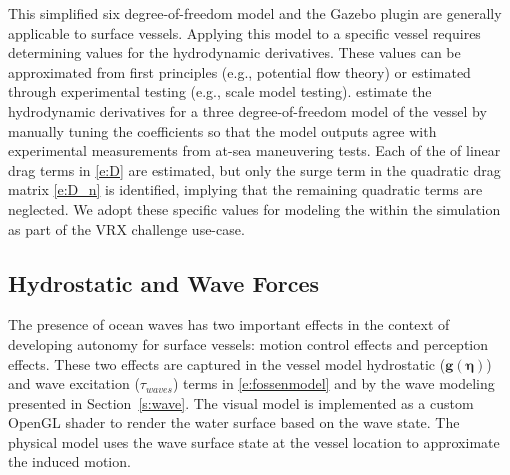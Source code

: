 \documentclass[utf8]{frontiersSCNS} %
\begin{document}
This simplified six degree-of-freedom model and the Gazebo plugin are generally applicable to surface vessels.  Applying this model to a specific vessel requires determining values for the hydrodynamic derivatives.  These values can be approximated from first principles (e.g., potential flow theory) or estimated through experimental testing (e.g., scale model testing).  \citet{sarda16station} estimate the hydrodynamic derivatives for a three degree-of-freedom model of the \wamv{} vessel by manually tuning the coefficients so that the model outputs agree with experimental measurements from at-sea maneuvering tests.  Each of the of linear drag terms in  \eqref{e:D} are estimated, but only the surge term in the quadratic drag matrix \eqref{e:D_n} is identified, implying that the remaining quadratic terms are neglected. We adopt these specific values for modeling the \wamv{} within the simulation as part of the VRX challenge use-case.

\subsection{Hydrostatic and Wave Forces}
The presence of ocean waves has two important effects in the context of developing autonomy for surface vessels: motion control effects and perception effects.  These two effects are captured in the vessel model hydrostatic  ($\bm{g}(\bm{\eta})$) and wave excitation ($\tau_{waves}$) terms in  \eqref{e:fossenmodel} and by the wave modeling presented in Section~\ref{s:wave}.  The visual model is implemented as a custom OpenGL shader to render the water surface based on the wave state.  The physical model uses the wave surface state at the vessel location to approximate the induced motion.  
\end{document}
